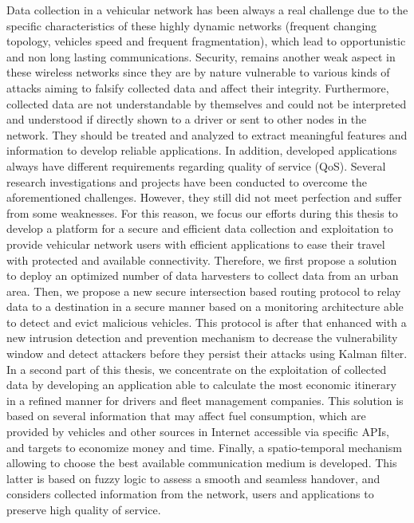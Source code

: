 Data collection in a vehicular network has been always a real challenge due to the specific characteristics of these highly dynamic networks (frequent changing topology,
	vehicles speed and frequent fragmentation),
	which lead to opportunistic and non long lasting communications.
Security,
	remains another weak aspect in these wireless networks since they are by nature vulnerable to various kinds of attacks aiming to falsify collected data and affect their integrity.
Furthermore,
	collected data are not understandable by themselves and could not be interpreted and understood if directly shown to a driver or sent to other nodes in the network.
They should be treated and analyzed to extract meaningful features and information to develop reliable applications.
In addition,
	developed applications always have different requirements regarding quality of service (QoS).
Several research investigations and projects have been conducted to overcome the aforementioned challenges.
However,
	they still did not meet perfection and suffer from some weaknesses.
For this reason,
	we focus our efforts during this thesis to develop a platform for a secure and efficient data collection and exploitation to provide vehicular network users with efficient applications to ease their travel with protected and available connectivity.
Therefore,
	we first propose a solution to deploy an optimized number of data harvesters to collect data from an urban area.
Then,
	we propose a new secure intersection based routing protocol to relay data to a destination in a secure manner based on a monitoring architecture able to detect and evict malicious vehicles.
This protocol is after that enhanced with a new intrusion detection and prevention mechanism to decrease the vulnerability window and detect attackers before they persist their attacks using Kalman filter.
In a second part of this thesis,
	we concentrate on the exploitation of collected data by developing an application able to calculate the most economic itinerary in a refined manner for drivers and fleet management companies.
This solution is based on several information that may affect fuel consumption,
	which are provided by vehicles and other sources in Internet accessible via specific APIs,
	and targets to economize money and time.
Finally,
	a spatio-temporal mechanism allowing to choose the best available communication medium is developed.
This latter is based on fuzzy logic to assess a smooth and seamless handover,
	and considers collected information from the network,
	users and applications to preserve high quality of service.


